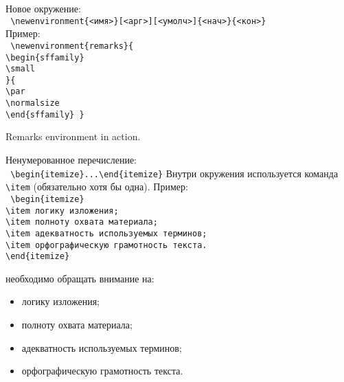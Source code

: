 \noindent
Новое окружение:\\
\texttt{
\textbackslash newenvironment\{<имя>\}[<арг>][<умолч>]\{<нач>\}\{<кон>\}}\\
Пример:\\
\texttt{
\textbackslash newenvironment\{remarks\}\{\\
    \textbackslash begin\{sffamily\}\\
    \textbackslash small\\
\}\{\\
    \textbackslash par\\
    \textbackslash normalsize\\
    \textbackslash end\{sffamily\}
\}
}

\newenvironment{remarks}{
    \begin{sffamily}
    \small
}{
    \par
    \normalsize
    \end{sffamily}
}

\begin{remarks}
    Remarks environment in action.
\end{remarks}

\clearpage

\noindent
Ненумерованное перечисление:\\
\texttt{
\textbackslash begin\{itemize\}...\textbackslash end\{itemize\}}
Внутри окружения используется команда \texttt{\textbackslash item} (обязательно хотя бы одна). Пример:\\
\texttt{
\textbackslash begin\{itemize\}\\
\phantom{~~~~} \textbackslash item логику изложения;\\
\phantom{~~~~} \textbackslash item полноту охвата материала;\\
\phantom{~~~~} \textbackslash item адекватность используемых терминов;\\
\phantom{~~~~} \textbackslash item орфографическую грамотность текста.\\
\textbackslash end\{itemize\}}\\
\medskip

\noindent
необходимо обращать внимание на:
\begin{itemize}
    \item логику изложения;
    \item полноту охвата материала;
    \item адекватность используемых терминов;
    \item орфографическую грамотность текста.
\end{itemize}

